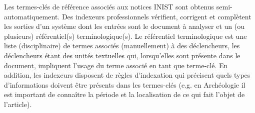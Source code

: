   Les termes-clés de référence associés aux notices INIST sont obtenus
  semi-automatiquement. Des indexeurs professionnels vérifient, corrigent et
  complètent les sorties d'un système dont les entrées sont le document à
  analyser et un (ou plusieurs) référentiel(s) terminologique(s). Le référentiel
  terminologique est une liste (disciplinaire) de termes associés (manuellement)
  à des déclencheurs, les déclencheurs étant des unités textuelles qui,
  lorsqu'elles sont présente dans le document, impliquent l'usage du terme
  associé en tant que terme-clé. En addition, les indexeurs disposent de règles
  d'indexation qui précisent quels types d'informations doivent être présents
  dans les termes-clés (e.g. en Archéologie il est important de connaître la
  période et la localisation de ce qui fait l'objet de l'article).

